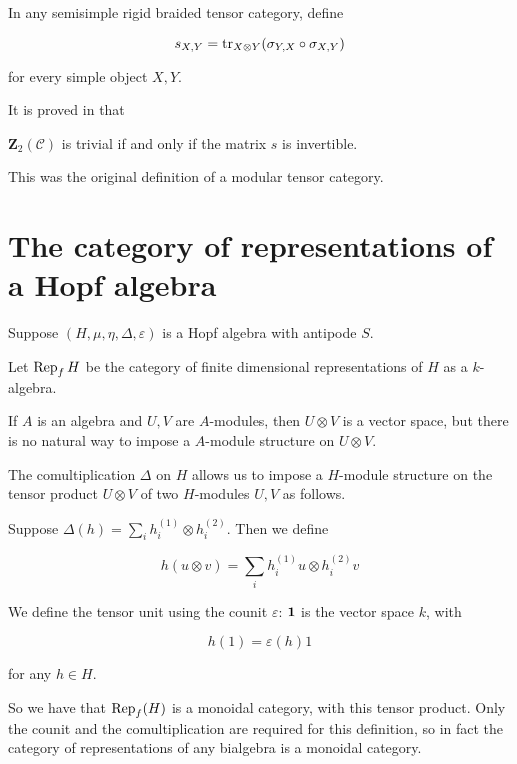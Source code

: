 In any semisimple rigid braided tensor category, define

\begin{equation}
    s_{X,Y} = \operatorname{tr}_{X \otimes Y}(\sigma_{Y,X} \circ \sigma_{X,Y})
\end{equation}

for every simple object $X,Y$.

It is proved in \cite{mueger2001} that
\begin{theorem}
    $\mathbf{Z}_2(\mathcal{C})$ is trivial if and only if the matrix $s$ is invertible. 
\end{theorem}

This was the original definition of a modular tensor category.

\section{The category of representations of a Hopf algebra}
\label{section:RepHopfAlgebra}

Suppose $(H, \mu, \eta, \Delta, \varepsilon)$ is a Hopf algebra with antipode $S$. 

Let $\operatorname{Rep}_f H$ be the category of finite dimensional representations of $H$ as
a $k$-algebra.

If $A$ is an algebra and $U, V$ are $A$-modules, then $U \otimes V$ is a vector
space, but there is no natural way to impose a $A$-module structure on $U
\otimes V$. 

The comultiplication $\Delta$ on $H$ allows us to impose a $H$-module structure
on the tensor product $U \otimes V$ of two $H$-modules $U,V$ as follows.

Suppose $\Delta(h) = \sum _{i} h^{(1)}_i \otimes h^{(2)}_i$. Then we define

\begin{equation}
    h (u \otimes v) = \sum_{i} h^{(1)}_i u \otimes h^{(2)}_i v
\end{equation}

We define the tensor unit using the counit $\varepsilon$: $\mathbf{1}$ is the
vector space $k$, with 

\begin{equation}
    h(1) = \varepsilon(h) 1
\end{equation}

 for any $h\in H$.

So we have that $\operatorname{Rep}_f(H)$ is a monoidal category, with this tensor product.
Only the counit and the comultiplication are required for this definition, so
in fact the category of representations of any bialgebra is a monoidal
category.


